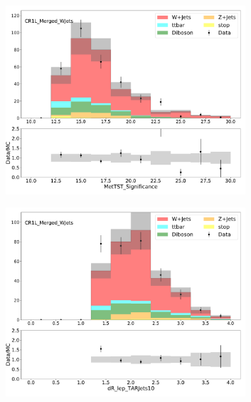 \begin{figure}[htbp]
\begin{subfigure}{0.49\textwidth}
     \caption{\mTAR}
     \end{subfigure}
    \begin{subfigure}{0.49\textwidth}
     \includegraphics[width = 0.98\textwidth]{Figures/4/datamc/CR1L_Merged_WJets/MetTST_Significance.pdf}
     \caption{\metsig}
     \end{subfigure}
    \begin{subfigure}{0.49\textwidth}
     \includegraphics[width = 0.98\textwidth]{Figures/4/datamc/CR1L_Merged_WJets/dR_lep_TARJets10.pdf}
     \caption{\drTARl}
     \end{subfigure}
     \begin{subfigure}{0.49\textwidth}

\end{subfigure}
\end{figure}
